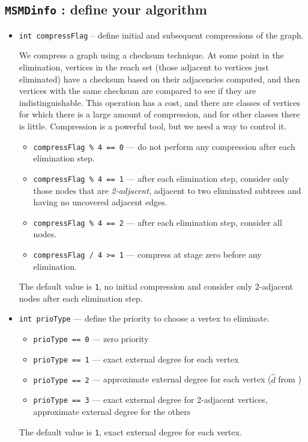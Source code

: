 \subsection{{\tt MSMDinfo} : define your algorithm}
\par
\begin{itemize}
\item
{\tt int compressFlag} -- define initial and subsequent compressions of
the graph.
\par
We compress a graph using a checksum technique.
At some point in the elimination, vertices in the reach set (those
adjacent to vertices just eliminated) have a checksum based on
their adjacencies computed, and then vertices with the same
checksum are compared to see if they are indistinguishable.
This operation has a cost, and there are classes of vertices for
which there is a large amount of compression, and for other
classes there is little.
Compression is a powerful tool, but we need a way to control it.
\begin{itemize}
\item
{\tt compressFlag \% 4 == 0} 
--- do not perform any compression after each elimination step.
\item
{\tt compressFlag \% 4 == 1} 
--- after each elimination step, consider only those nodes that are
{\it 2-adjacent}, adjacent to two eliminated subtrees and having no
uncovered adjacent edges.
\item
{\tt compressFlag \% 4 == 2} 
--- after each elimination step, consider all nodes.
\item
{\tt compressFlag / 4 >= 1} --- compress at stage zero before any
elimination.
\end{itemize}
The default value is {\tt 1}, no initial compression and
consider only 2-adjacent nodes after each elimination step.
\item
{\tt int prioType} --- 
define the priority to choose a vertex to eliminate.
\begin{itemize}
\item
{\tt prioType == 0} 
--- zero priority
\item
{\tt prioType == 1} 
--- exact external degree for each vertex
\item
{\tt prioType == 2} 
--- approximate external degree for each vertex
(${\hat d}$ from \cite{ame96-amd})
\item
{\tt prioType == 3} 
--- exact external degree for 2-adjacent vertices, approximate
external degree for the others
\end{itemize}
The default value is {\tt 1}, exact external degree for each vertex.

\end{itemize}
